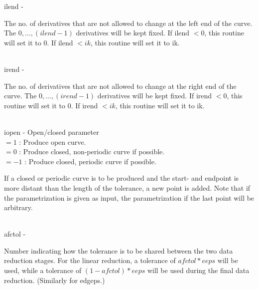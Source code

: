         \>\>    {\fov ilend}\> - \>  \begin{minipg2}
                     The no. of derivatives that are not allowed to change
                 at the left end of the curve.
                 The $0,\ldots,(ilend-1)$ derivatives will be kept fixed.
                 If ilend $<0$, this routine will set it to 0.
                 If ilend $<ik$, this routine will set it to ik.
                               \end{minipg2}\\[0.8ex]
        \>\>    {\fov irend}\> - \>  \begin{minipg2}
                     The no. of derivatives that are not allowed to change
                 at the right end of the curve.
                 The $0,\ldots,(irend-1)$ derivatives will be kept fixed.
                 If irend $<0$, this routine will set it to 0.
                 If irend $<ik$, this routine will set it to ik.
                               \end{minipg2}\\[0.8ex]
        \>\>    {\fov iopen}\> - \>  Open/closed parameter\\
            \>\>\>\>  $= 1$  : Produce open curve.\\
            \>\>\>\>  $= 0$ : Produce closed, non-periodic curve if possible.\\
            \>\>\>\>  $= -1$ : Produce closed, periodic curve if possible.\\
                 \>\>\>\>  \begin{minipg2}
                 If a closed or periodic curve is to be produced and the
                 start- and endpoint is more distant than the length of
                 the tolerance, a new point is added. Note that if the
                 parametrization is given as input, the parametrization
                 if the last point will be arbitrary.
                                \end{minipg2}\\
        \>\>    {\fov afctol}\> - \>  \begin{minipg2}
                 Number indicating how the tolerance is to be shared
                 between the two data reduction stages. For the linear
                 reduction, a tolerance of $afctol*eeps$ will be used,
                 while a tolerance of $(1-afctol)*eeps$ will be used
                 during the final data reduction. (Similarly for edgeps.)
                               \end{minipg2}\\
